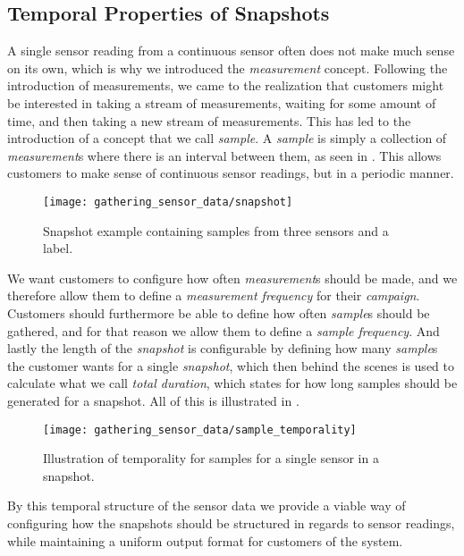 \subsection{Temporal Properties of Snapshots}
\label{sec:temporal_properties_of_snapshots}

A single sensor reading from a continuous sensor often does not make much sense on its own, which is why we introduced the \emph{measurement} concept. Following the introduction of measurements, we came to the realization that customers might be interested in taking a stream of measurements, waiting for some amount of time, and then taking a new stream of measurements. This has led to the introduction of a concept that we call \emph{sample}. A \emph{sample} is simply a collection of \emph{measurement}s where there is an interval between them, as seen in . This allows customers to make sense of continuous sensor readings, but in a periodic manner. 

\begin{figure}[!htbp]
    \centering
    \texttt{[image: gathering\_sensor\_data/snapshot]}
    \caption{Snapshot example containing samples from three sensors and a label.}
    \label{fig:snapshot_example_with_samples}
\end{figure}
\FloatBarrier

We want customers to configure how often \emph{measurement}s should be made, and we therefore allow them to define a \emph{measurement frequency} for their \emph{campaign}. Customers should furthermore be able to define how often \emph{sample}s should be gathered, and for that reason we allow them to define a \emph{sample frequency}. And lastly the length of the \emph{snapshot} is configurable by defining how many \emph{sample}s the customer wants for a single \emph{snapshot}, which then behind the scenes is used to calculate what we call \emph{total duration}, which states for how long samples should be generated for a snapshot. All of this is illustrated in . 

\begin{figure}[!htbp]
    \centering
    \texttt{[image: gathering\_sensor\_data/sample\_temporality]}
    \caption{Illustration of temporality for samples for a single sensor in a snapshot.}
    \label{fig:sample_temporality}
\end{figure}
\FloatBarrier

By this temporal structure of the sensor data we provide a viable way of configuring how the snapshots should be structured in regards to sensor readings, while maintaining a uniform output format for customers of the system.
